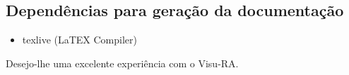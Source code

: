 \documentclass[onecolumn,12pt]{article}
\begin{document}
    	\subsection{Dependências para \textbf{geração} da \textbf{documentação}}
    		\begin{itemize}
    			\item texlive	(LaTEX Compiler)
    		\end{itemize}
    	

    \newpage
    \begin{large}
    	Desejo-lhe uma excelente experiência com o Visu-RA.
    \end{large}
\end{document}
